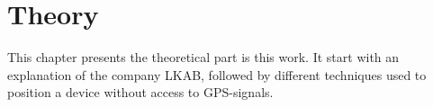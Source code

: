 \chapter{Theory}\label{theory}
This chapter presents the theoretical part is this work.
It start with an explanation of the company LKAB, followed by 
different techniques used to position a device without access to GPS-signals.








